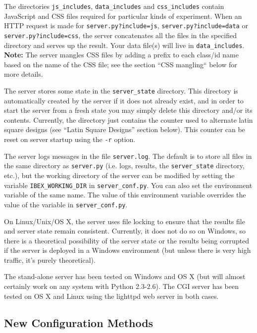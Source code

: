 \documentclass[11pt,letterpaper]{article}
\begin{document}
The directories \texttt{js\_includes}, \texttt{data\_includes} and \texttt{css\_includes}
contain JavaScript and CSS files required for particular kinds of
experiment. When an HTTP request is made for \texttt{server.py?include=js},
\texttt{server.py?include=data} or \texttt{server.py?include=css}, the server
concatenates all the files in the specified directory and serves up
the result. Your data file(s) will live in \texttt{data\_includes}.
\textbf{Note:} The server mangles CSS files by adding a prefix to each
class/id name based on the name of the CSS file; see the section ``CSS
mangling`` below for more details.

The server stores some state in the \texttt{server\_state} directory. This
directory is automatically created by the server if it does not
already exist, and in order to start the server from a fresh state you
may simply delete this directory and/or its contents. Currently, the
directory just contains the counter used to alternate latin square
designs (see ``Latin Square Designs'' section below). This counter can
be reset on server startup using the \texttt{-r} option.

The server logs messages in the file \texttt{server.log}. The default is to
store all files in the same directory as \texttt{server.py} (i.e. logs,
results, the \texttt{server\_state} directory, etc.), but the working
directory of the server can be modified by setting the variable
\texttt{IBEX\_WORKING\_DIR} in \texttt{server\_conf.py}. You can also set the
environment variable of the same name.  The value of this environment
variable overrides the value of the variable in \texttt{server\_conf.py}.

On Linux/Unix/OS X, the server uses file locking to ensure that the
results file and server state remain consistent. Currently, it does
not do so on Windows, so there is a theoretical possibility of the
server state or the results being corrupted if the server is deployed
in a Windows environment (but unless there is very high traffic, it's
purely theoretical).

The stand-alone server has been tested on Windows and OS X (but will
almost certainly work on any system with Python 2.3-2.6).  The CGI
server has been tested on OS X and Linux using the lighttpd web server
in both cases.

\subsection{New Configuration Methods}
\end{document}
